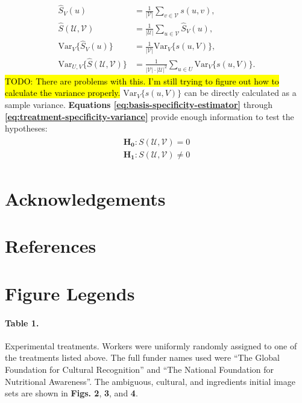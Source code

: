 \documentclass[a4paper]{report}
\newcommand{\td}[1]{{\color{blu}\hl{TODO: #1}}}
\begin{document}
\begin{align}
	\hat{S}_V(u) &= \frac{1}{|\mathcal{V}|} \sum_{v \in \mathcal{V}} s(u,v), 
		\label{eq:basis-specificity-estimator} \\
		\hat{S}(\mathcal{U},\mathcal{V}) 
		&= \frac{1}{|\mathcal{U}|} \sum_{u \in \mathcal{V}} \hat{S}_V(u),
		\label{eq:treatment-specificity-estimator} \\
		\text{Var}_V\{\hat{S}_V(u)\} 
			&= \frac{1}{|\mathcal{V}|}\text{Var}_V\{s(u,V)\},
		\label{eq:basis-specificity-variance} \\
		\text{Var}_{U,V}\{\hat{S}(\mathcal{U},\mathcal{V})\} 
			&= \frac{1}{|\mathcal{V}|\cdot|\mathcal{U}|^2} 
			\sum_{u\in U}\text{Var}_V\{{s}(u,V)\}.
		\label{eq:treatment-specificity-variance}
\end{align}
\td{There are problems with this.  I'm still trying to figure out how to
	calculate the variance properly.}
$\text{Var}_V\{s(u,V)\}$ can be directly calculated as a sample variance.
\textbf{Equations \ref{eq:basis-specificity-estimator}} through 
\textbf{\ref{eq:treatment-specificity-variance}} provide enough information to test the hypotheses:
\begin{align}
	\begin{matrix}
		\mathbf{H_0}: S(\mathcal{U}, \mathcal{V}) = 0 \\[0.5em]
		\mathbf{H_1}: S(\mathcal{U}, \mathcal{V}) \neq 0
	\end{matrix}
\end{align}

\section*{Acknowledgements}
\section*{References}
\begingroup
\renewcommand{\chapter}[2]{}

\endgroup
 

\section*{Figure Legends}

\paragraph{Table 1.}
	Experimental treatments.  Workers were uniformly randomly
	assigned to one of the treatments listed above.  The full funder 
	names used were ``The Global Foundation
	for Cultural Recognition'' and ``The National Foundation for 
	Nutritional Awareness''.  The ambiguous, cultural, and ingredients 
	initial image sets are shown in \textbf{Figs. 2}, \textbf{3}, and 
	\textbf{4}.
\end{document}
